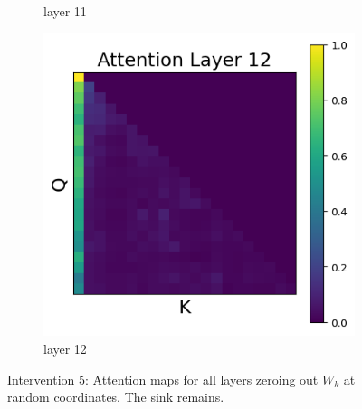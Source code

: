 \documentclass[11pt]{article}
\begin{document}
\begin{figure}[t]
\begin{subfigure}[t]{0.24\textwidth}
    \caption{layer 11}
  \end{subfigure}\hfill
  \begin{subfigure}[t]{0.24\textwidth}
    \centering
    \includegraphics[width=1.4\columnwidth]{figures/intervention5_2/layer_12.png}
    \caption{layer 12}
  \end{subfigure}\hfill

  \caption{Intervention 5: Attention maps for all layers zeroing out $W_k$ at random coordinates. The sink remains.}
\end{figure}
\end{document}
